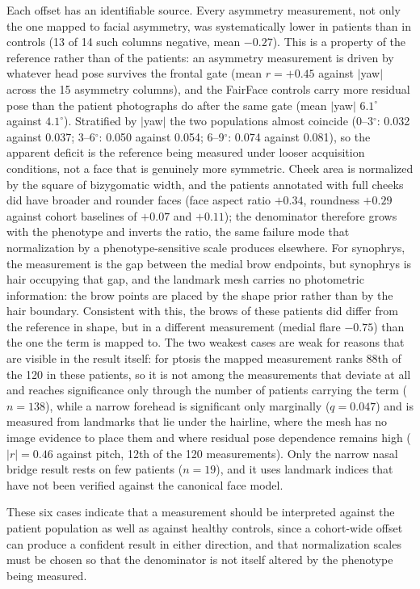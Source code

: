 \documentclass[11pt]{article}
\begin{document}
Each offset has an identifiable source. Every asymmetry measurement, not only the
one mapped to facial asymmetry, was systematically lower in patients than in
controls (13 of 14 such columns negative, mean $-0.27$). This is a property of the
reference rather than of the patients: an asymmetry measurement is driven by
whatever head pose survives the frontal gate (mean $r=+0.45$ against $|$yaw$|$
across the 15 asymmetry columns), and the FairFace controls carry more residual
pose than the patient photographs do after the same gate (mean $|$yaw$|$
$6.1^{\circ}$ against $4.1^{\circ}$). Stratified by $|$yaw$|$ the two populations
almost coincide (0--3$^{\circ}$: 0.032 against 0.037; 3--6$^{\circ}$: 0.050
against 0.054; 6--9$^{\circ}$: 0.074 against 0.081), so the apparent deficit is
the reference being measured under looser acquisition conditions, not a face that
is genuinely more symmetric. Cheek area is normalized by the square of bizygomatic width, and the
patients annotated with full cheeks did have broader and rounder faces
(face aspect ratio $+0.34$, roundness $+0.29$ against cohort baselines of $+0.07$
and $+0.11$); the denominator therefore grows with the phenotype and inverts the
ratio, the same failure mode that normalization by a phenotype-sensitive scale
produces elsewhere. For synophrys, the measurement is the gap between the medial
brow endpoints, but synophrys is hair occupying that gap, and the landmark mesh
carries no photometric information: the brow points are placed by the shape prior
rather than by the hair boundary. Consistent with this, the brows of these patients
did differ from the reference in shape, but in a different measurement
(medial flare $-0.75$) than the one the term is mapped to. The two weakest cases
are weak for reasons that are visible in the result itself: for ptosis the mapped
measurement ranks 88th of the 120 in these patients, so it is not among the
measurements that deviate at all and reaches significance only through the number
of patients carrying the term ($n=138$), while a narrow forehead is significant
only marginally ($q=0.047$) and is measured from landmarks that lie under the
hairline, where the mesh has no image evidence to place them and where residual
pose dependence remains high ($|r|=0.46$ against pitch, 12th of the 120
measurements). Only the
narrow nasal bridge result rests on few patients ($n=19$), and it uses landmark
indices that have not been verified against the canonical face model.

These six cases indicate that a measurement should be interpreted against the
patient population as well as against healthy controls, since a cohort-wide offset
can produce a confident result in either direction, and that normalization scales
must be chosen so that the denominator is not itself altered by the phenotype being
measured.
\end{document}
